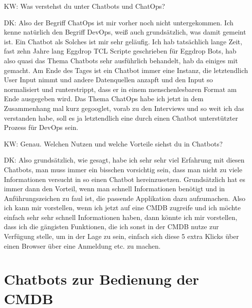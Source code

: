 \begin{list}{X:}{\setlength{\labelsep}{5mm}}
\item[KW:] Was verstehst du unter Chatbots und ChatOps?
\item[DK:] Also der Begriff ChatOps ist mir vorher noch nicht untergekommen. Ich kenne natürlich den Begriff DevOps, weiß auch grundsätzlich, was damit gemeint ist. Ein Chatbot als Solches ist mir sehr geläufig. Ich hab tatsächlich lange Zeit, fast zehn Jahre lang Eggdrop TCL Scripte geschrieben für Eggdrop Bots, hab also quasi das Thema Chatbots sehr ausführlich behandelt, hab da einiges mit gemacht. Am Ende des Tages ist ein Chatbot immer eine Instanz, die letztendlich User Input nimmt und andere Datenquellen anzapft und den Input so normalisiert und runterstrippt, dass er in einem menschenlesbaren Format am Ende ausgegeben wird. Das Thema ChatOps habe ich jetzt in dem Zusammenhang mal kurz gegooglet, vorab zu den Interviews und so weit ich das verstanden habe, soll es ja letztendlich eine durch einen Chatbot unterstützter Prozess für DevOps sein.
\item[KW:] Genau. Welchen Nutzen und welche Vorteile siehst du in Chatbots? 
\item[DK:] Also grundsätzlich, wie gesagt, habe ich sehr sehr viel Erfahrung mit diesen Chatbots, man muss immer ein bisschen vorsichtig sein, dass man nicht zu viele Informationen versucht in so einen Chatbot hereinzusetzen. Grundsätzlich hat es immer dann den Vorteil, wenn man schnell Informationen benötigt und in Anführungszeichen zu faul ist, die passende Applikation dazu aufzumachen. Also ich kann mir vorstellen, wenn ich jetzt auf eine CMDB zugreife und ich möchte einfach sehr sehr schnell Informationen haben, dann könnte ich mir vorstellen, dass ich die gängisten Funktionen, die ich sonst in der CMDB nutze zur Verfügung stelle, um in der Lage zu sein, einfach sich diese 5 extra Klicks über einen Browser über eine Anmeldung etc. zu machen.
\end{list}

\section*{Chatbots zur Bedienung der CMDB}

